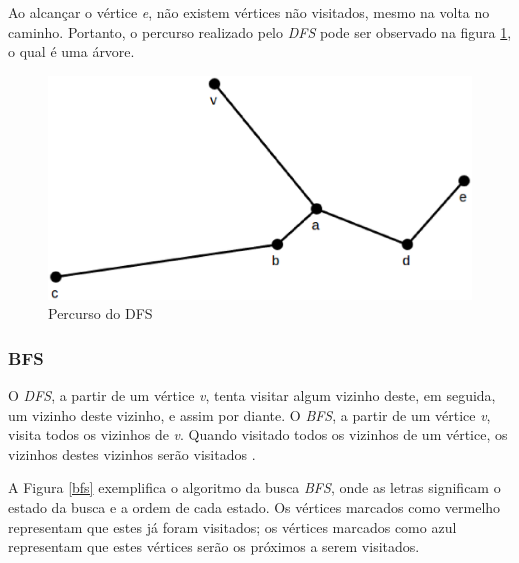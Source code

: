 Ao alcançar o vértice \textit{e}, não existem vértices não visitados, mesmo na volta no caminho. Portanto, o percurso realizado pelo \textit{DFS} pode ser observado na figura \ref{dfs_percurso}, o qual é uma árvore.

\begin{figure}[!h]
	\centering
	\includegraphics[scale=0.25]{figuras/capitulo2/dfs/dfs_percurso.eps}
	\caption[Percurso do DFS]{Percurso do DFS \cite{Cormen:2001}}
	\label{dfs_percurso}
\end{figure}

\subsubsection{BFS}
\label{subsec:bfs}

O \textit{DFS}, a partir de um vértice \textit{v}, tenta visitar algum vizinho deste, em seguida, um vizinho deste vizinho, e assim por diante. O \textit{BFS}, a partir de um vértice \textit{v}, visita todos os vizinhos de \textit{v}. Quando visitado todos os vizinhos de um vértice, os vizinhos destes vizinhos serão visitados \cite{Brassard:1988}.

A Figura \ref{bfs} exemplifica o algoritmo da busca \textit{BFS}, onde as letras significam o estado da busca e a ordem de cada estado. Os vértices marcados como vermelho representam que estes já foram visitados; os vértices marcados como azul representam que estes vértices serão os próximos a serem visitados.


